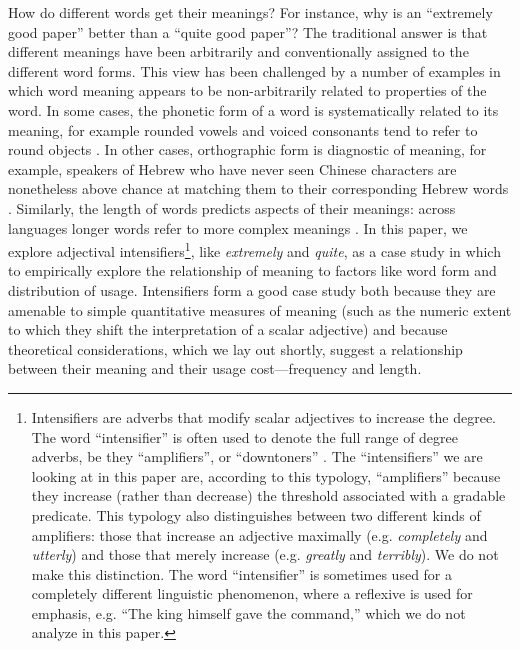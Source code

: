 \documentclass[10pt,letterpaper]{article}
\newcommand{\w}[1]{\emph{#1}}
\begin{document}
How do different words get their meanings?
For instance, why is an ``extremely good paper'' better than a ``quite good paper''? The traditional answer \cite{saussure} is that different meanings have been arbitrarily and conventionally assigned to the different word forms.
This view has been challenged by a number of examples in which word meaning appears to be non-arbitrarily related to properties of the word.
In some cases, the phonetic form of a word is systematically related to its meaning, for example rounded vowels and voiced consonants tend to refer to round objects \cite{maluma-takete, bouba-kiki, bouba-kiki2, takete-uloomo}. 
In other cases, orthographic form is diagnostic of meaning, for example, speakers of Hebrew who have never seen Chinese characters are nonetheless above chance at matching them to their corresponding Hebrew words \cite{koriat}. 
Similarly, the length of words predicts aspects of their meanings: across languages longer words refer to more complex meanings \cite{lewis}.
In this paper, we explore adjectival intensifiers\footnote{Intensifiers are adverbs that modify scalar adjectives to increase the degree. The word ``intensifier'' is often used to denote the full range of degree adverbs, be they ``amplifiers'', or ``downtoners'' \cite{quirk}. The ``intensifiers'' we are looking at in this paper are, according to this typology, ``amplifiers'' because they increase (rather than decrease) the threshold associated with a gradable predicate. This typology also distinguishes between two different kinds of amplifiers: those that increase an adjective maximally (e.g. \w{completely} and \w{utterly}) and those that merely increase (e.g. \w{greatly} and \w{terribly}). We do not make this distinction. The word ``intensifier'' is sometimes used for a completely different linguistic phenomenon, where a reflexive is used for emphasis, e.g. ``The king himself gave the command,'' which we do not analyze in this paper.}, like \w{extremely} and \w{quite},
as a case study in which to empirically explore the relationship of meaning to factors like word form and distribution of usage.
Intensifiers form a good case study both because they are amenable to simple quantitative measures of meaning (such as the numeric extent to which they shift the interpretation of a scalar adjective) and because theoretical considerations, which we lay out shortly, suggest a relationship between their meaning and their usage cost---frequency and length.
\end{document}

